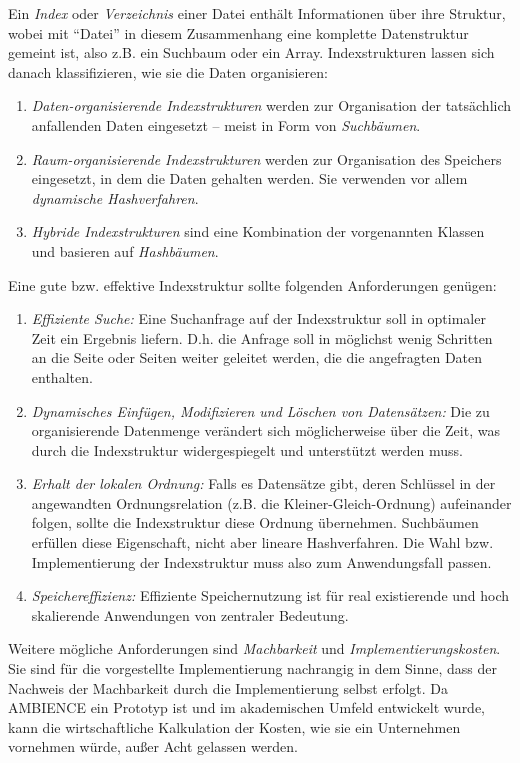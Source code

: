 Ein \textit{Index} oder \textit{Verzeichnis} einer Datei enthält Informationen über ihre Struktur, wobei mit "`Datei"' in diesem Zusammenhang eine komplette Datenstruktur gemeint ist, also z.B. ein Suchbaum oder ein Array. Indexstrukturen lassen sich danach klassifizieren, wie sie die Daten organisieren: 
\begin{enumerate}
	\item \textit{Daten-organisierende Indexstrukturen} werden zur Organisation der tatsächlich anfallenden Daten eingesetzt -- meist in Form von \textit{Suchbäumen}. 
	\item \textit{Raum-organisierende Indexstrukturen} werden zur Organisation des Speichers eingesetzt, in dem die Daten gehalten werden. Sie verwenden vor allem \textit{dynamische Hashverfahren}. 
	\item \textit{Hybride Indexstrukturen} sind eine Kombination der vorgenannten Klassen und basieren auf \textit{Hashbäumen}.   
\end{enumerate}
\enlargethispage{2\baselineskip}
Eine gute bzw. effektive Indexstruktur sollte folgenden Anforderungen genügen: 
\begin{enumerate}
	\item \textit{Effiziente Suche:} Eine Suchanfrage auf der Indexstruktur soll in optimaler Zeit ein Ergebnis liefern. D.h. die Anfrage soll in möglichst wenig Schritten an die Seite oder Seiten weiter geleitet werden, die die angefragten Daten enthalten.
	\item \textit{Dynamisches Einfügen, Modifizieren und Löschen von Datensätzen:} Die zu organisierende Datenmenge verändert sich möglicherweise über die Zeit, was durch die Indexstruktur widergespiegelt und unterstützt werden muss.  
	\item \textit{Erhalt der lokalen Ordnung:} Falls es Datensätze gibt, deren Schlüssel in der angewandten Ordnungsrelation (z.B. die Kleiner-Gleich-Ordnung) aufeinander folgen, sollte die Indexstruktur diese Ordnung übernehmen. Suchbäumen erfüllen diese Eigenschaft, nicht aber lineare Hashverfahren. Die Wahl bzw. Implementierung der Indexstruktur muss also zum Anwendungsfall passen. 
	\item \textit{Speichereffizienz:} Effiziente Speichernutzung ist für real existierende und hoch skalierende Anwendungen von zentraler Bedeutung. 
\end{enumerate}
Weitere mögliche Anforderungen sind \textit{Machbarkeit} und \textit{Implementierungskosten}. Sie sind für die vorgestellte Implementierung nachrangig in dem Sinne, dass der Nachweis der Machbarkeit durch die Implementierung selbst erfolgt. Da AMBIENCE ein Prototyp ist und im akademischen Umfeld entwickelt wurde, kann die wirtschaftliche Kalkulation der Kosten, wie sie ein Unternehmen vornehmen würde, außer Acht gelassen werden. 

